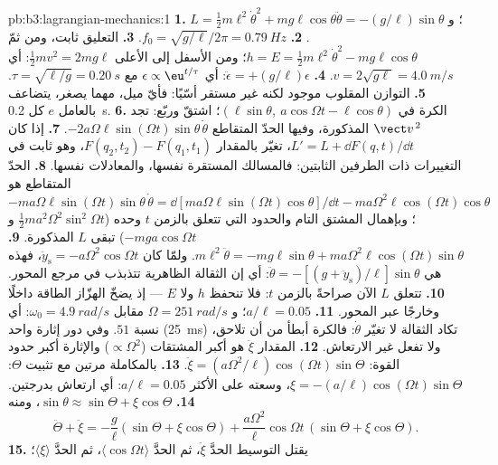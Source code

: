 \begin{solution}{pb:b3:lagrangian-mechanics:1}
\textbf{1.} $L = \tfrac12 m\ell^2\dot\theta^2 + mg\ell\cos\theta$؛
و $\ddot\theta = -(g/\ell)\sin\theta$.
\textbf{2.} $f_0 = \sqrt{g/\ell}/2\pi = \qty{0.79}{Hz}$.
\textbf{3.} التعليق ثابت، ومن ثمّ $h = E = \tfrac12
m\ell^2\dot\theta^2 - mg\ell\cos\theta$؛ ومن الأسفل إلى الأعلى $\tfrac12
mv^2 = 2mg\ell$: أي $v = 2\sqrt{g\ell} = \qty{4.0}{m/s}$.
\textbf{4.} $\ddot\epsilon = +(g/\ell)\epsilon$: أي $\epsilon \propto
\eu^{t/\tau}$ مع $\tau = \sqrt{\ell/g} = \qty{0.20}{s}$.
\textbf{5.} التوازن المقلوب موجود لكنه غير مستقر أسّيًا: فأيّ
ميل، مهما يصغر، يتضاعف بالعامل $e$ كل
\qty{0.2}{s}.
\textbf{6.} الكرة في $(\ell\sin\theta,\ a\cos\Omega t - \ell\cos\theta)$؛
اشتقّ وربّع: تجد $\vect v^{\,2}$ المذكورة، وفيها الحدّ المتقاطع
$-2a\Omega\ell\sin(\Omega t)\sin\theta\,\dot\theta$.
\textbf{7.} إذا كان $L' = L + \dd F(q,t)/\dd t$، تغيّر  بالمقدار
$F(q_2, t_2) - F(q_1, t_1)$، وهو ثابت في التغييرات ذات الطرفين
الثابتين: فالمسالك المستقرة نفسها، والمعادلات نفسها.
\textbf{8.} الحدّ المتقاطع هو $-ma\Omega\ell\sin(\Omega t)\sin\theta\,
\dot\theta = \dd[ma\Omega\ell\sin(\Omega t)\cos\theta]/\dd t -
ma\Omega^2\ell\cos(\Omega t)\cos\theta$؛ وبإهمال المشتق التام
والحدود التي تتعلق بالزمن $t$ وحده ($\tfrac12 ma^2\Omega^2\sin^2\Omega t$ و
$-mga\cos\Omega t$) تبقى $L$ المذكورة.
\textbf{9.} $m\ell^2\ddot\theta = -mg\ell\sin\theta +
ma\Omega^2\ell\cos(\Omega t)\sin\theta$. ولمّا كان $\ddot y_{\text{s}} =
-a\Omega^2\cos\Omega t$، فهذه هي $\ddot\theta =
-[(g + \ddot y_{\text{s}})/\ell]\sin\theta$: أي إن الثقالة الظاهرية
تتذبذب في مرجع المحور.
\textbf{10.} تتعلق $L$ الآن صراحةً بالزمن $t$: فلا تنحفظ $h$
ولا $E$ --- إذ يضخّ الهزّاز الطاقة داخلًا وخارجًا عبر المحور.
\textbf{11.} $a/\ell = 0.05$؛ و $\Omega = \qty{251}{rad/s}$ مقابل
$\omega_0 = \qty{4.9}{rad/s}$: أي نسبة $51$. وفي دور إثارة واحد
(\qty{25}{ms}) تكاد الثقالة لا تغيّر $\dot\theta$: فالكرة أبطأ من
أن تلاحق، ولا تفعل غير الارتعاش.
\textbf{12.} المقدار $\ddot\xi$ هو أكبر المشتقات ($\propto\Omega^2$)
والإثارة أكبر حدود القوة: $\ddot\xi =
(a\Omega^2/\ell)\cos(\Omega t)\sin\Theta$.
\textbf{13.} بالمكاملة مرتين مع تثبيت $\Theta$: $\xi =
-(a/\ell)\cos(\Omega t)\sin\Theta$، وسعته على الأكثر $a/\ell =
0.05$: أي ارتعاش بدرجتين.
\textbf{14.} $\sin\theta \approx \sin\Theta + \xi\cos\Theta$، ومنه
\[
\ddot\Theta + \ddot\xi = -\frac{g}{\ell}(\sin\Theta + \xi\cos\Theta)
 + \frac{a\Omega^2}{\ell}\cos\Omega t\,(\sin\Theta + \xi\cos\Theta) .
\]
\textbf{15.} يقتل التوسيط الحدَّ $\ddot\xi$، ثم الحدَّ
$\langle\cos\Omega t\rangle$، ثم الحدَّ $\langle\xi\rangle$؛

\end{solution}
